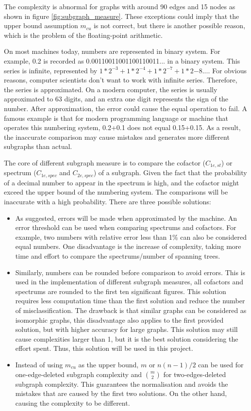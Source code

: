 \documentclass[12pt]{article}
\begin{document}
The complexity is abnormal for graphs with around 90 edges and 15 nodes as shown in figure \ref{fig:subgraph_measure}. These exceptions could imply that the upper bound assumption $m_{cu}$ is not correct, but there is another possible reason, which is the problem of the floating-point arithmetic.\par
On most machines today, numbers are represented in binary system\cite{floating_point}. For example, 0.2 is recorded as 0.00110011001100110011... in a binary system. This series is infinite, represented by $1*2^{-3}+1*2^{-4}+1*2^{-7}+1*2{-8}...$. For obvious reasons, computer scientists don't want to work with infinite series. Therefore, the series is approximated. On a modern computer, the series is usually approximated to 63 digits, and an extra one digit represents the sign of the number. After approximation, the error could cause the equal operation to fail. A famous example is that for modern programming language or machine that operates this numbering system, 0.2+0.1 does not equal 0.15+0.15. As a result, the inaccurate comparison may cause mistakes and generates more different subgraphs than actual.\par
The core of different subgraph measure is to compare the cofactor ($C_{1e,st}$) or spectrum ($C_{1e,spec}$ and $C_{2e,spec}$) of a subgraph. Given the fact that the probability of a decimal number to appear in the spectrum is high, and the cofactor might exceed the upper bound of the numbering system\cite{python_int}. The comparisons will be inaccurate with a high probability. There are three possible solutions:
\begin{itemize}
    \item As suggested, errors will be made when approximated by the machine. An error threshold can be used when comparing spectrums and cofactors. For example, two numbers with relative error less than 1\% can also be considered equal numbers. One disadvantage is the increase of complexity, taking more time and effort to compare the spectrums/number of spanning trees.
    \item Similarly, numbers can be rounded before comparison to avoid errors. This is used in the implementation of different subgraph measures, all cofactors and spectrums are rounded to the first ten significant figures. This solution requires less computation time than the first solution and reduce the number of misclassification. The drawback is that similar graphs can be considered as isomorphic graphs, this disadvantage also applies to the first provided solution, but with higher accuracy for large graphs. This solution may still cause complexities larger than 1, but it is the best solution considering the effort spent. Thus, this solution will be used in this project.
    \item Instead of using $m_{cu}$ as the upper bound, $m$ or $n(n-1)/2$ can be used for one-edge-deleted subgraph complexity and $\genfrac(){0pt}{2}{m}{2}$ for two-edges-deleted subgraph complexity. This guarantees the normalisation and avoids the mistakes that are caused by the first two solutions. On the other hand, causing the complexity to be different.
\end{itemize}
\end{document}
